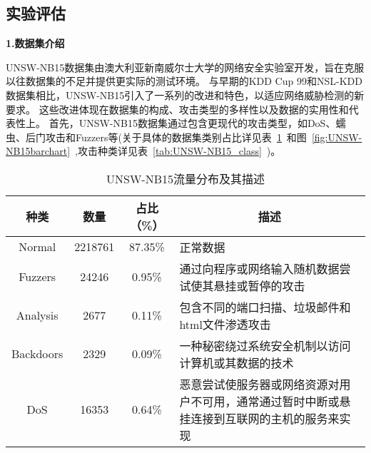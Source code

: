 \subsection{实验评估}
\textbf{1.数据集介绍}\par
UNSW-NB15数据集\cite{moustafa2015comprehensive}由澳大利亚新南威尔士大学的网络安全实验室开发，旨在克服以往数据集的不足并提供更实际的测试环境。
与早期的KDD Cup 99和NSL-KDD数据集相比，UNSW-NB15引入了一系列的改进和特色，以适应网络威胁检测的新要求。
这些改进体现在数据集的构成、攻击类型的多样性以及数据的实用性和代表性上。
首先，UNSW-NB15数据集通过包含更现代的攻击类型，如DoS、蠕虫、后门攻击和Fuzzers等(关于具体的数据集类别占比详见表~\ref{tab:UNSW-NB15_distribution}~和图~\ref{fig:UNSW-NB15barchart}~,攻击种类详见表~\ref{tab:UNSW-NB15_class}~)。
\begin{table}[h]
	\caption{UNSW-NB15流量分布及其描述}
	\label{tab:UNSW-NB15_distribution}
	\begin{tabularx}{\textwidth}{@{}cccX@{}}
		\toprule
		\multicolumn{1}{c}{\textbf{种类}} & \multicolumn{1}{c}{\textbf{数量}} & \multicolumn{1}{c}{\textbf{占比（\%）}} & \multicolumn{1}{c}{\textbf{描述}}                                                                \\
		\midrule
		Normal                            & 2218761                           & 87.35\%                                 & 正常数据                                                                                         \\

		Fuzzers                           & 24246                             & 0.95\%                                  & 通过向程序或网络输入随机数据尝试使其悬挂或暂停的攻击                                             \\

		Analysis                          & 2677                              & 0.11\%                                  & 包含不同的端口扫描、垃圾邮件和html文件渗透攻击                                                   \\

		Backdoors                         & 2329                              & 0.09\%                                  & 一种秘密绕过系统安全机制以访问计算机或其数据的技术                                               \\

		DoS                               & 16353                             & 0.64\%                                  & 恶意尝试使服务器或网络资源对用户不可用，通常通过暂时中断或悬挂连接到互联网的主机的服务来实现     \\


\end{tabularx}
\end{table}
